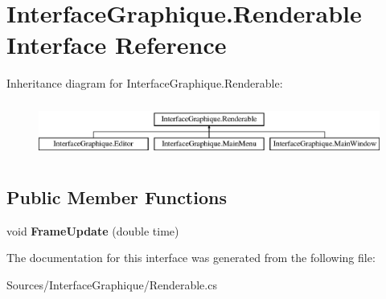 \hypertarget{interface_interface_graphique_1_1_renderable}{}\section{Interface\+Graphique.\+Renderable Interface Reference}
\label{interface_interface_graphique_1_1_renderable}
Inheritance diagram for Interface\+Graphique.\+Renderable\+:\begin{figure}[H]
\begin{center}
\leavevmode
\includegraphics[height=1.830065cm]{interface_interface_graphique_1_1_renderable}
\end{center}
\end{figure}
\subsection*{Public Member Functions}
\begin{DoxyCompactItemize}
\item 
\hypertarget{interface_interface_graphique_1_1_renderable_a25c30c0df9a336f382132c852fe403b0}{}void {\bfseries Frame\+Update} (double time)\label{interface_interface_graphique_1_1_renderable_a25c30c0df9a336f382132c852fe403b0}

\end{DoxyCompactItemize}


The documentation for this interface was generated from the following file\+:\begin{DoxyCompactItemize}
\item 
Sources/\+Interface\+Graphique/Renderable.\+cs\end{DoxyCompactItemize}
